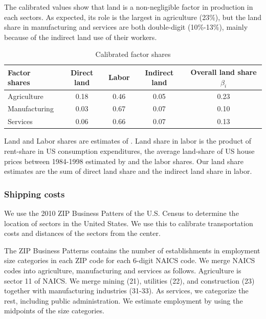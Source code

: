 \documentclass[12pt]{article}
\begin{document}
The calibrated values show that land is a non-negligible factor in production in each sectors. As expected, its role is the largest in agriculture (23\%), but the land share in manufacturing and services are both double-digit (10\%-13\%), mainly because of the indirect land use of their workers.


\begin{table}[h!]
\label{tab:Sector_Shares}
\caption{Calibrated factor shares}
\begin{center}
\begin{tabular}{l|ccc|c}
\toprule
Factor shares & Direct land & Labor & Indirect land & Overall land share $\beta_i$ \\
\midrule
Agriculture & 0.18 & 0.46  & 0.05 & 0.23 \\
Manufacturing& 0.03 & 0.67 & 0.07 & 0.10  \\
Services    &  0.06 & 0.66 & 0.07 & 0.13 \\
\bottomrule
\end{tabular}
\end{center}

\noindent \footnotesize{Land and Labor shares are estimates of . Land share in labor is the product of rent-share in US consumption expenditures, the average land-share of US house prices between 1984-1998 estimated by  and the labor shares. Our land share estimates are the sum of direct land share and the indirect land share in labor.}
\end{table}

\subsubsection{Shipping costs}

We use the 2010 ZIP Business Patters of the U.S. Census to determine the location of sectors in the United States. We use this to calibrate transportation costs and distances of the sectors from the center.

The ZIP Business Patterns contains the number of establishments in employment size categories in each ZIP code for each 6-digit NAICS code. We merge NAICS codes into agriculture, manufacturing and services as follows. Agriculture is sector 11 of NAICS. We merge mining (21), utilities (22), and construction (23) together with manufacturing industries (31-33). As services, we categorize the rest, including public administration. We estimate employment by using the midpoints of the size categories.
\end{document}
